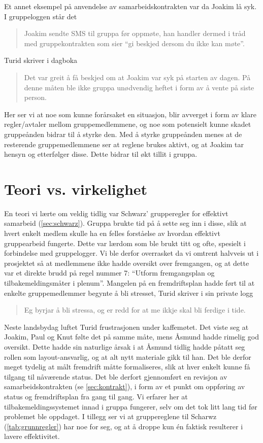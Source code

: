 Et annet eksempel på anvendelse av samarbeidskontrakten var da Joakim lå syk. I
gruppeloggen står det
\begin{quote}
Joakim sendte SMS til gruppa før oppmøte, han handler
dermed i tråd med gruppekontrakten som sier ``gi beskjed dersom du ikke kan
møte''.
\end{quote}
 Turid skriver i dagboka 
 \begin{quote}
 Det var greit å få beskjed om at Joakim var
syk på starten av dagen. På denne måten ble ikke gruppa unødvendig heftet i form
av å vente på siste person. 
\end{quote}
Her ser vi at noe som kunne forårsaket en situasjon, blir avverget i form av 
klare regler/avtaler mellom
gruppemedlemmene, og noe som potensielt kunne skadet gruppeånden bidrar til å
styrke den. Med å styrke gruppeånden menes at de resterende gruppemedlemmene ser
at reglene brukes aktivt, og at Joakim tar hensyn og etterfølger disse. Dette
bidrar til økt tillit i gruppa.\\

\section{Teori vs. virkelighet}
En teori vi lærte om veldig tidlig var Schwarz' grupperegler for effektivt
samarbeid (\cref{sec:schwarz}). Gruppa brukte tid på å sette seg inn i disse, slik at
hvert enkelt medlem skulle ha en felles forståelse av hvordan effektivt
gruppearbeid fungerte. Dette var lærdom som ble brukt titt og ofte, spesielt i
forbindelse med gruppelogger. Vi ble derfor overrasket da vi omtrent halvveis ut
i prosjektet så at medlemmene ikke hadde oversikt over fremgangen, og at dette var et
direkte brudd på regel nummer 7: ``Utform fremgangsplan og tilbakemeldingsmåter
i plenum''. Mangelen på en fremdriftsplan hadde ført til at enkelte
gruppemedlemmer begynte å bli stresset, Turid skriver i sin private logg \\
\begin{quote}
Eg byrjar å bli stressa, og er redd for at me ikkje skal bli ferdige i tide.
\end{quote}

Neste landsbydag luftet Turid frustrasjonen under kaffemøtet. Det viste seg at
Joakim, Paul og Knut følte det på samme måte, mens Åsmund hadde rimelig god
oversikt. Dette hadde sin naturlige årsak i at Åsmund tidlig hadde påtatt seg
rollen som layout-ansvarlig, og at alt nytt materiale gikk til han. Det ble
derfor meget tydelig at målt fremdrift måtte formaliseres, slik at hver enkelt
kunne få tilgang til nåværende status. Det ble derfort gjennomført en revisjon
av samarbeidskontrakten (se \cref{sec:kontrakt}), i form av et punkt om oppføring av
status og fremdriftsplan fra gang til gang. Vi erfarer her at
tilbakemeldingssystemet innad i gruppa fungerer, selv om det tok litt lang tid
før problemet ble oppdaget. I tillegg ser vi at gruppereglene til Scharwz
(\cref{tab:grunnregler}) har noe for seg, og at å droppe kun én faktisk
resulterer i lavere effektivitet.\\ 

